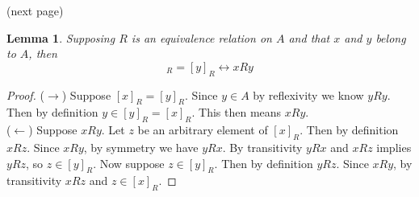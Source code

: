 \documentclass{report}
\newtheorem{lemma}[theo]{Lemma}
\begin{document}
\noindent(next page)\newpage
\begin{lemma}\label{equiv_rls_lemma}
Supposing $R$ is an equivalence relation on $A$ and that $x$ and $y$ belong to $A$, then
\begin{equation*}
[x]_R=[y]_R\leftrightarrow xRy
\end{equation*}
\end{lemma}
\begin{proof}
($\rightarrow$) Suppose $[x]_R=[y]_R$. Since $y\in A$ by reflexivity we know $yRy$.
Then by definition $y\in[y]_R=[x]_R$. This then means $xRy$.\\
\indent($\leftarrow$) Suppose $xRy$. Let $z$ be an arbitrary element of $[x]_R$. Then by definition $xRz$. Since $xRy$, by symmetry we have $yRx$. By transitivity $yRx$ and $xRz$ implies $yRz$, so 
$z\in[y]_R$. Now suppose $z\in[y]_R$. Then by definition $yRz$. Since $xRy$, by transitivity $xRz$ and $z\in[x]_R$.
\end{proof}
\end{document}
